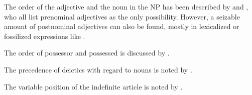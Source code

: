 The order of the adjective and the noun in the NP has been described by  \citet{Adelaar1991,Jayasuriya2002,SmithRH} and \citet{Slomanson2007cll}, who all list prenominal adjectives as the only possibility. However, a seizable amount of postnominal adjectives can also be found, mostly in lexicalized or fossilized expressions like .

The order of possessor and possessed is discussed by \citep{Adelaar1991, Slomanson2007cll, Jayasuriya2002}.

The precedence of deictics with regard to nouns is noted by \citep{Adelaar1991, Adelaar2005struct}.

The variable position of the indefinite article is noted by \citet{Slomanson2007cll}.




